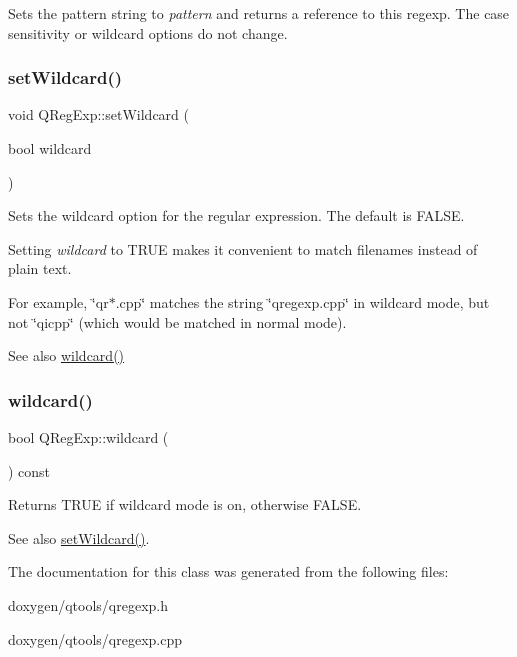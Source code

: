Sets the pattern string to {\itshape pattern} and returns a reference to this regexp. The case sensitivity or wildcard options do not change. \mbox{\label{class_q_reg_exp_a706203a025db3f506cced8e34faa8d4e}} 
\subsubsection{\texorpdfstring{setWildcard()}{setWildcard()}}
{\footnotesize\ttfamily void Q\+Reg\+Exp\+::set\+Wildcard (\begin{DoxyParamCaption}\item[{bool}]{wildcard }\end{DoxyParamCaption})}

Sets the wildcard option for the regular expression. The default is F\+A\+L\+SE.

Setting {\itshape wildcard} to T\+R\+UE makes it convenient to match filenames instead of plain text.

For example, \char`\"{}qr$\ast$.\+cpp\char`\"{} matches the string \char`\"{}qregexp.\+cpp\char`\"{} in wildcard mode, but not \char`\"{}qicpp\char`\"{} (which would be matched in normal mode).

\begin{DoxySeeAlso}{See also}
\mbox{\hyperlink{class_q_reg_exp_ab56c5356c514e92127cfea318fe47ba9}{wildcard()}} 
\end{DoxySeeAlso}
\mbox{\label{class_q_reg_exp_ab56c5356c514e92127cfea318fe47ba9}} 
\subsubsection{\texorpdfstring{wildcard()}{wildcard()}}
{\footnotesize\ttfamily bool Q\+Reg\+Exp\+::wildcard (\begin{DoxyParamCaption}{ }\end{DoxyParamCaption}) const\hspace{0.3cm}{\ttfamily [inline]}}

Returns T\+R\+UE if wildcard mode is on, otherwise F\+A\+L\+SE. \begin{DoxySeeAlso}{See also}
\mbox{\hyperlink{class_q_reg_exp_a706203a025db3f506cced8e34faa8d4e}{set\+Wildcard()}}. 
\end{DoxySeeAlso}


The documentation for this class was generated from the following files\+:\begin{DoxyCompactItemize}
\item 
doxygen/qtools/qregexp.\+h\item 
doxygen/qtools/qregexp.\+cpp\end{DoxyCompactItemize}
